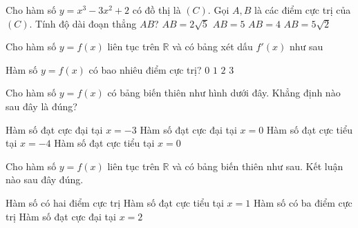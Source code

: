 \begin{ex}%
	Cho hàm số $y=x^3-3x^2+2$ có đồ thị là $(C)$. Gọi $A,B$ là các điểm cực trị của $(C)$. Tính độ dài đoạn thẳng $AB$?
	\choice
	{\True $AB=2\sqrt{5}$}
	{$AB=5$}
	{$AB=4$}
	{$AB=5\sqrt{2}$}
\end{ex}
\begin{ex}%
	Cho hàm số $y=f(x)$ liên tục trên $\mathbb{R}$ và có bảng xét dấu $f'(x)$ như sau
	\begin{center}
	\end{center}
	Hàm số $y=f(x)$ có bao nhiêu điểm cực trị?
	\choice
	{$0$}
	{$1$}
	{\True $2$}
	{$3$}
\end{ex}
\begin{ex}%
	Cho hàm số $y=f(x)$ có bảng biến thiên như hình dưới đây. Khẳng định nào sau đây là đúng?
	\begin{center}
	\end{center}
	\choice
	{Hàm số đạt cực đại tại $x=-3$}
	{\True Hàm số đạt cực đại tại $x=0$}
	{Hàm số đạt cực tiểu tại $x=-4$}
	{Hàm số đạt cực tiểu tại $x=0$}
\end{ex}
\begin{ex}%
	Cho hàm số $y=f(x)$ liên tục trên $\mathbb{R}$ và có bảng biến thiên như sau. Kết luận nào sau đây đúng.
	\begin{center}
	\end{center}
	\choice
	{\True Hàm số có hai điểm cực trị}
	{Hàm số đạt cực tiểu tại $x=1$}
	{Hàm số có ba điểm cực trị}
	{Hàm số đạt cực đại tại $x=2$}
	\loigiai{}
\end{ex}
